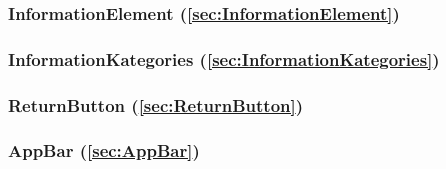 \documentclass[parskip=full]{scrartcl}
\begin{document}
\subsubsection*{InformationElement (\ref{sec:InformationElement})}

\subsubsection*{InformationKategories (\ref{sec:InformationKategories})}

\subsubsection*{ReturnButton (\ref{sec:ReturnButton})}

\subsubsection*{AppBar (\ref{sec:AppBar})}
\end{document}
